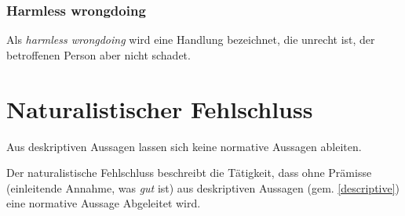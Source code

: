 \documentclass[../main.tex]{subfiles}
\begin{document}
\subsubsection{Harmless wrongdoing}
Als \textit{harmless wrongdoing} wird eine Handlung bezeichnet, die unrecht ist, der betroffenen Person aber nicht schadet.

\section{Naturalistischer Fehlschluss}
\begin{warningbox}
Aus deskriptiven Aussagen lassen sich keine normative Aussagen ableiten.
\end{warningbox}
Der naturalistische Fehlschluss beschreibt die Tätigkeit, dass ohne Prämisse (einleitende Annahme, was \textit{gut} ist) aus deskriptiven Aussagen (gem. \ref{descriptive}) eine normative Aussage Abgeleitet wird. 
\end{document}
